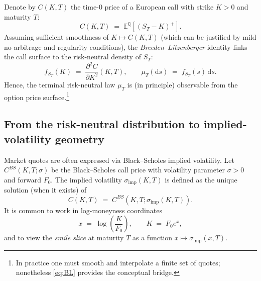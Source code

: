 \documentclass[11pt,a4paper]{report}
\begin{document}
Denote by $C(K,T)$ the time-$0$ price of a European call with strike $K>0$ and maturity $T$:
\begin{equation}
C(K,T) \;=\; \mathbb{E}^{\mathbb{Q}}\!\left[(S_T-K)^+\right].
\end{equation}
Assuming sufficient smoothness of $K \mapsto C(K,T)$ (which can be justified by mild no-arbitrage and regularity conditions), the \emph{Breeden--Litzenberger} identity links the call surface to the risk-neutral density of $S_T$:
\begin{equation}
f_{S_T}(K) \;=\; \frac{\partial^2 C}{\partial K^2}(K,T),
\qquad
\mu_T(\mathrm{d}s) \;=\; f_{S_T}(s)\,\mathrm{d}s.
\label{eq:BL}
\end{equation}
Hence, the terminal risk-neutral law $\mu_T$ is (in principle) observable from the option price surface.\footnote{In practice one must smooth and interpolate a finite set of quotes; nonetheless \eqref{eq:BL} provides the conceptual bridge.}

\subsection{From the risk-neutral distribution to implied-volatility geometry}
Market quotes are often expressed via Black--Scholes implied volatility.
Let $C^{BS}(K,T;\sigma)$ be the Black--Scholes call price with volatility parameter $\sigma>0$ and forward $F_0$.
The implied volatility $\sigma_{\mathrm{imp}}(K,T)$ is defined as the unique solution (when it exists) of
\begin{equation}
C(K,T) \;=\; C^{BS}\!\left(K,T;\sigma_{\mathrm{imp}}(K,T)\right).
\end{equation}
It is common to work in log-moneyness coordinates
\begin{equation}
x \;=\; \log\!\left(\frac{K}{F_0}\right),
\qquad
K \;=\; F_0 e^{x},
\end{equation}
and to view the \emph{smile slice} at maturity $T$ as a function $x \mapsto \sigma_{\mathrm{imp}}(x,T)$.
\end{document}
